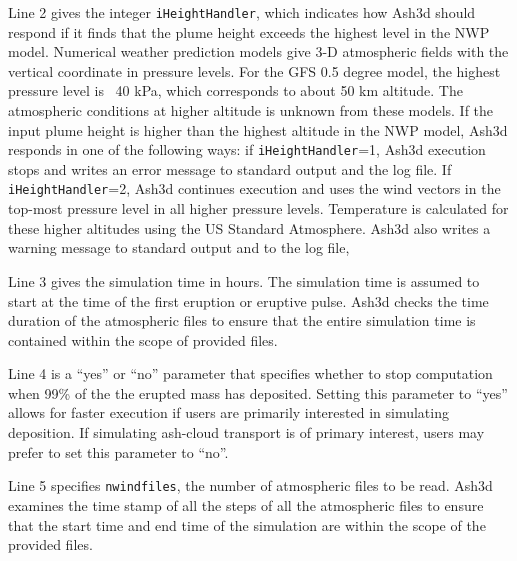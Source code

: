 Line 2 gives the integer \texttt{iHeightHandler}, which indicates how Ash3d should respond
if it finds that the plume height exceeds the highest level in the NWP model.
Numerical weather prediction models give 3-D atmospheric fields with the vertical coordinate
in pressure levels. For the GFS 0.5 degree model, the highest pressure level is ~40 kPa,
which corresponds to about 50 km altitude. The atmospheric conditions at higher altitude is
unknown from these models. If the input plume height is higher than the highest
altitude in the NWP model, Ash3d responds in one of the following ways: if
\texttt{iHeightHandler}=1, Ash3d execution stops and writes an error message to standard output
and the log file.
If \texttt{iHeightHandler}=2, Ash3d continues execution and uses the wind vectors in the
top-most pressure level in all higher pressure levels. Temperature is calculated for these
higher altitudes using the US Standard Atmosphere. Ash3d also writes a warning
message to standard output and to the log file,

Line 3 gives the simulation time in hours. The simulation time is assumed to start
at the time of the first eruption or eruptive pulse. Ash3d checks the time duration
of the atmospheric files to ensure that the entire simulation time is contained within
the scope of provided files.

Line 4 is a ``yes'' or ``no'' parameter that specifies whether to stop computation
when 99\% of the the erupted mass has deposited. Setting this parameter to ``yes''
allows for faster execution if users are primarily interested in simulating
deposition. If simulating ash-cloud transport is of primary interest, users may
prefer to set this parameter to ``no''.

Line 5 specifies \texttt{nwindfiles}, the number of atmospheric files to be read.
Ash3d examines the time stamp of all the steps of all the atmospheric files to ensure
that the start time and end time of the simulation are within the scope of the
provided files.


